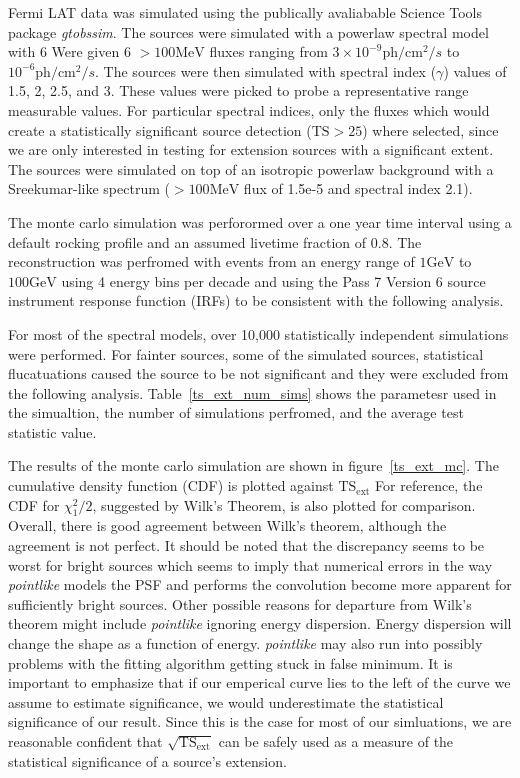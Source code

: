 \documentclass[preprint]{aastex}
\newcommand{\mev}{\text{MeV}\xspace}
\newcommand{\gev}{\text{GeV}\xspace}
\newcommand{\ph}{\text{ph}\xspace}
\newcommand{\cm}{\text{cm}\xspace}
\newcommand{\tsext}{\ensuremath{\text{TS}_\text{ext}}\xspace}
\newcommand{\ts}{\text{TS}\xspace}
\newcommand{\pointlike}{{\em pointlike}\xspace}
\newcommand{\gtobssim}{{\em gtobssim}\xspace}
\begin{document}
Fermi LAT data was simulated using the publically avaliabable Science
Tools package \gtobssim\cite{GTOBSSIM_CITATION}. The sources were
simulated with a powerlaw spectral model with 6 Were given 6 $>100\mev$
fluxes ranging from $3\times 10^{-9} \ph/\cm^2/s$ to 
$10^{-6} \ph/\cm^2/s$.
The sources were then simulated with spectral index ($\gamma$) values of
1.5, 2, 2.5, and 3.  These values were picked to probe a representative
range measurable values.  For particular spectral indices, only the
fluxes which would create a statistically significant source detection
($\ts>25$) where selected, since we are only interested in
testing for extension sources with a significant extent. The sources were
simulated on top of an isotropic powerlaw background with a Sreekumar-like
spectrum ($>100\mev$ flux of 1.5e-5 and spectral index 2.1).\cite{Sreekumar
et al. ApJ 494 pag 523 1998}

The monte carlo simulation was perforormed over a one year time interval using
a default rocking profile and an assumed livetime fraction of 0.8.
The reconstruction was perfromed with events from an energy range of
$1\gev$ to $100\gev$ using 4 energy bins per decade and using the Pass 7 Version 6
source instrument response function (IRFs) to be consistent with the following analysis.

For most of the spectral models, over 10,000 statistically independent simulations were performed.
For fainter sources, some of the simulated sources, statistical flucatuations
caused the source to be not significant and they were excluded from the following analysis.
Table~\ref{ts_ext_num_sims} shows the parametesr used in the simualtion,
the number of simulations perfromed, and the average test statistic value.

The results of the monte carlo simulation are shown in
figure~\ref{ts_ext_mc}.  The cumulative density function (CDF) is plotted
against $\tsext$ For reference, the CDF for $\chi^2_1/2$,
suggested by Wilk's Theorem, is also plotted for comparison. Overall,
there is good agreement between Wilk's theorem, although the agreement is
not perfect.  It should be noted that the discrepancy seems to be worst
for bright sources which seems to imply that numerical errors in the
way \pointlike models the PSF and performs the convolution become more
apparent for sufficiently bright sources.  Other possible reasons for
departure from Wilk's theorem might include \pointlike ignoring energy
dispersion. Energy dispersion will change the shape as a function of
energy. \pointlike may also run into possibly problems with the fitting
algorithm getting stuck in false minimum. It is important to emphasize
that if
our emperical curve lies to the left of the curve we assume to estimate
significance, we would underestimate the statistical significance of
our result. Since this is the case for most of our simluations, we are
reasonable confident that $\sqrt{\tsext}$ can be safely
used as a measure of the statistical significance of a source's extension.
\end{document}
